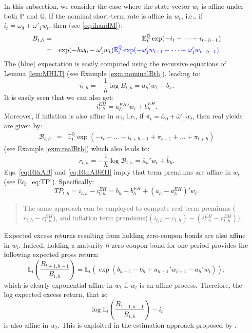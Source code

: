 \documentclass[
  12pt,
]{book}
\theoremstyle{definition}
\theoremstyle{definition}
\theoremstyle{definition}
\theoremstyle{definition}
\theoremstyle{remark}
\begin{document}
In this subsection, we consider the case where the state vector \(w_t\) is affine under both \(\mathbb{P}\) and \(\mathbb{Q}\). If the nominal short-term rate is affine in \(w_t\), i.e., if \(i_t = \omega_0 + \omega'_1 w_t\), then (see \eqref{eq:ihandM}):
\begin{eqnarray*}
B_{t,h} &=& \mathbb{E}^{\mathbb{Q}}_t \exp (-i_{t}-\dots-i_{t+h-1})\\
&=& \exp(-h\omega_0 - \omega'_1 w_t) \color{blue}{\mathbb{E}^{\mathbb{Q}}_t \exp (- \omega'_1 w_{t+1}-\dots- \omega'_1 w_{t+h-1})}.
\end{eqnarray*}
The (blue) expectation is easily computed using the recursive equations of Lemma \ref{lem:MHLT} (see Example \ref{exm:nominalBth}), leading to:
\begin{equation}
i_{t,h}= -  \frac{1}{h}   \log   B_{t,h} = a_h'w_t + b_h.\label{eq:RthAB}
\end{equation}
It is easily seen that we can also get:
\begin{equation}
i^{EH}_{t,h} = {a^{EH}_h}'w_t + b^{EH}_h.\label{eq:RthABEH}
\end{equation}
Moreover, if inflation is also affine in \(w_t\), i.e., if \(\pi_{t} = \bar\omega_0 + \bar\omega'_1 w_t\), then real yields are given by:
\begin{eqnarray*}
\mathcal{B}_{t,h} &=& \mathbb{E}^{\mathbb{Q}}_t \exp(-i_{t}-\dots-i_{t+h-1}+\pi_{t+1}+\dots+\pi_{t+h})
\end{eqnarray*}
(see Example \ref{exm:realBth}) which also leads to:
\begin{equation}
r_{t,h} = -  \frac{1}{h}   \log   \mathcal{B}_{t,h} = \bar{a}_h'w_t + \bar{b}_h.\label{eq:RbarthAB}
\end{equation}
Eqs. \eqref{eq:RthAB} and \eqref{eq:RthABEH} imply that term premiums are affine in \(w_t\) (see Eq. \eqref{eq:TP}). Specifically:
\[
TP_{t,h} = i_{t,h} - i^{EH}_{t,h} = b_h - b_h^{EH} + (a_h - a_h^{EH})'w_t.
\]

\begin{quote}
The same approach can be employed to compute real term premiums (\(r_{t,h} - r^{EH}_{t,h}\)), and inflation term premiums(\((i_{t,h}-r_{t,h}) - (i^{EH}_{t,h}-r^{EH}_{t,h})\)).
\end{quote}

Expected excess returns resulting from holding zero-coupon bonds are also affine in \(w_t\). Indeed, holding a maturity-\(h\) zero-coupon bond for one period provides the following expected gross return:
\[
\mathbb{E}_t\left(\frac{B_{t+1,h-1}}{B_{t,h}}\right) = \mathbb{E}_t\left(\exp(b_{h-1} - b_h + a_{h-1}'w_{t+1} - a_h'w_{t})\right),
\]
which is clearly exponential affine in \(w_t\) if \(w_t\) is an affine process. Therefore, the log expected excess return, that is:
\[
\log \mathbb{E}_t\left(\frac{B_{t+1,h-1}}{B_{t,h}}\right) - i_t
\]
is also affine in \(w_t\). This is exploited in the estimation approach proposed by \citet{Adrian_Crump_Moench_2013}.
\end{document}
